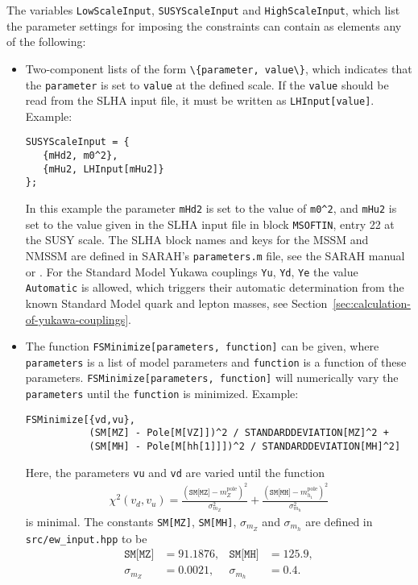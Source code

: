 \documentclass[final,3p,11pt,pdflatex]{elsarticle}
\newcommand{\code}[1]{\lstinline|#1|}  %
\newcommand{\pole}{\text{pole}}
\newcommand{\secref}[1]{Section~\ref{#1}}
\begin{document}
%
The variables \code{LowScaleInput}, \code{SUSYScaleInput} and
\code{HighScaleInput}, which list the parameter settings for imposing
the constraints can contain as elements any of the following:
%
\begin{itemize}
\item Two-component lists of the form \code{\{parameter, value\}},
  which indicates that the \code{parameter} is set to \code{value} at
  the defined scale.  If the \code{value} should be read from the SLHA
  input file, it must be written as \code{LHInput[value]}.  Example:
  \begin{lstlisting}
SUSYScaleInput = {
   {mHd2, m0^2},
   {mHu2, LHInput[mHu2]}
};
  \end{lstlisting}
  In this example the parameter \code{mHd2} is set to the value of
  \code{m0^2}, and \code{mHu2} is set to the value given in the SLHA
  input file in block \code{MSOFTIN}, entry 22 at the SUSY scale.  The
  SLHA block names and keys for the MSSM and NMSSM are defined in
  SARAH's \code{parameters.m} file, see the SARAH manual or
  \cite{Staub:2010jh}.  For the Standard Model Yukawa couplings
  \code{Yu}, \code{Yd}, \code{Ye} the value \code{Automatic} is
  allowed, which triggers their automatic determination from the known
  Standard Model quark and lepton masses, see
  \secref{sec:calculation-of-yukawa-couplings}.

\item The function \code{FSMinimize[parameters, function]} can be
  given, where \code{parameters} is a list of model parameters and
  \code{function} is a function of these parameters.
  \code{FSMinimize[parameters, function]} will numerically vary the
  \code{parameters} until the \code{function} is minimized.  Example:
  \begin{lstlisting}
FSMinimize[{vd,vu},
           (SM[MZ] - Pole[M[VZ]])^2 / STANDARDDEVIATION[MZ]^2 +
           (SM[MH] - Pole[M[hh[1]]])^2 / STANDARDDEVIATION[MH]^2]
  \end{lstlisting}
  Here, the parameters \code{vu} and \code{vd} are varied until the
  function
  \begin{align}
    \chi^2(v_d,v_u) =
    \frac{(\texttt{SM[MZ]}-m_Z^\pole)^2}{\sigma_{m_Z}^2} +
    \frac{(\texttt{SM[MH]}-m_{h_1}^\pole)^2}{\sigma_{m_h}^2}
  \end{align}
  is minimal.  The constants \code{SM[MZ]}, \code{SM[MH]},
  $\sigma_{m_Z}$ and $\sigma_{m_h}$ are defined in
  \code{src/ew_input.hpp} to be
  \begin{align}
    \texttt{SM[MZ]} &= 91.1876, &
    \texttt{SM[MH]} &= 125.9, \\
    \sigma_{m_Z} &= 0.0021, &
    \sigma_{m_h} &= 0.4 .
  \end{align}


\end{itemize}
\end{document}
